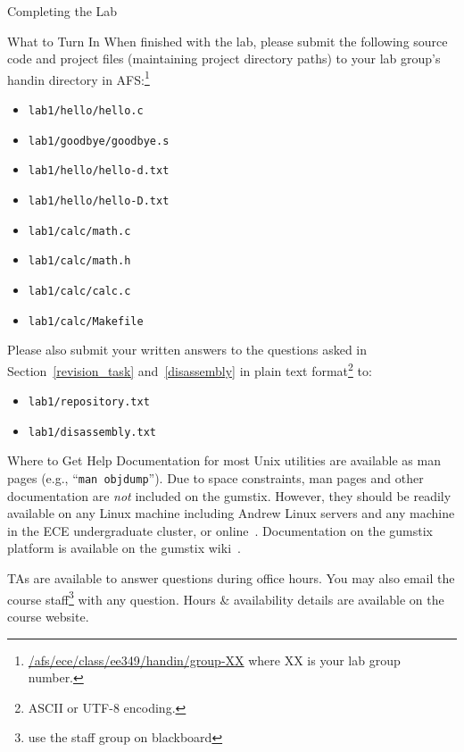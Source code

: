 \documentclass{article}
\begin{document}
		\begin{section}{Completing the Lab}
		\begin{subsection}{What to Turn In}
			When finished with the lab, please submit the following source code and
			project files (maintaining project directory paths) to your lab group's
			handin directory in
			AFS:\footnote{\url{/afs/ece/class/ee349/handin/group-XX} where XX is
			your lab group number.}
			\begin{itemize}
				\item \texttt{lab1/hello/hello.c}
				\item \texttt{lab1/goodbye/goodbye.s}
				\item \texttt{lab1/hello/hello-d.txt}
				\item \texttt{lab1/hello/hello-D.txt}
				\item \texttt{lab1/calc/math.c}
				\item \texttt{lab1/calc/math.h}
				\item \texttt{lab1/calc/calc.c}
				\item \texttt{lab1/calc/Makefile}
			\end{itemize}
			Please also submit your written answers to the questions asked in
			Section~\ref{revision_task} and~\ref{disassembly} in plain text 
			format\footnote{ASCII or UTF-8 encoding.} to:
			\begin{itemize}
				\item \texttt{lab1/repository.txt}
				\item \texttt{lab1/disassembly.txt}
			\end{itemize}
		\end{subsection}

		\begin{subsection}{Where to Get Help}
			Documentation for most Unix utilities are available as man pages (e.g.,
			``\verb|man objdump|'').  Due to space constraints, man pages and other
			documentation are \emph{not} included on the gumstix.  However, they should
			be readily available on any Linux machine including Andrew Linux servers
			and any machine in the ECE undergraduate cluster, or
			online~\cite{Name:LinuxManPages}.  Documentation on the gumstix platform is
			available on the gumstix wiki~\cite{gumstix:wiki}.

			TAs are available to answer questions during office hours.  You may also
			email the course staff\footnote{use the staff group on blackboard} with any
			question.  Hours \& availability details are available on the course
			website.
		\end{subsection}


\end{section}
\end{document}

